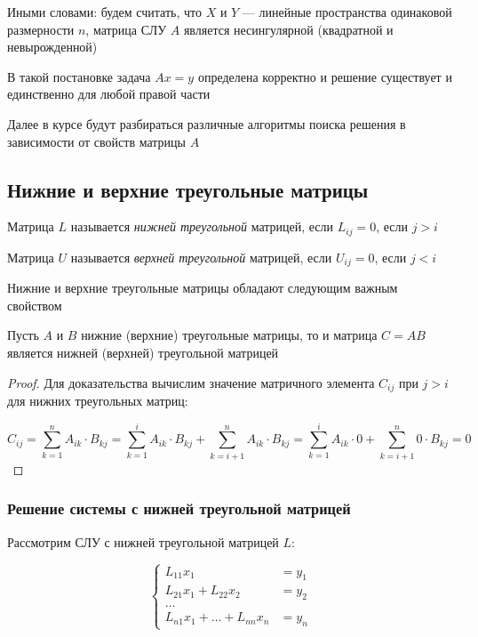 Иными словами: будем считать, что $X$ и $Y$ --- линейные пространства одинаковой размерности $n$, матрица СЛУ $A$ является несингулярной (квадратной и невырожденной)

В такой постановке задача $Ax=y$ определена корректно и решение существует и единственно для любой правой части

Далее в курсе будут разбираться различные алгоритмы поиска решения в зависимости от свойств матрицы $A$

\subsection{Нижние и верхние треугольные матрицы}

\begin{definition}
Матрица $L$ называется \textit{нижней треугольной} матрицей, если $L_{ij} = 0$, если $j > i$
\end{definition}

\begin{definition}
Матрица $U$ называется \textit{верхней треугольной} матрицей, если $U_{ij} = 0$, если $j < i$
\end{definition}

Нижние и верхние треугольные матрицы обладают следующим важным свойством

\begin{claim}
Пусть $A$ и $B$ нижние (верхние) треугольные матрицы, то и матрица $C = AB$ является нижней (верхней) треугольной матрицей
\end{claim}

\begin{proof}
    Для доказательства вычислим значение матричного элемента $C_{ij}$ при $j > i$ для нижних треугольных матриц:

    \[
    C_{ij} = \sum\limits_{k = 1}^n A_{ik} \cdot B_{kj} = \sum\limits_{k = 1}^i A_{ik} \cdot B_{kj} + \sum\limits_{k = i+1}^n A_{ik} \cdot B_{kj} = \sum\limits_{k = 1}^i A_{ik} \cdot 0 + \sum\limits_{k = i+1}^n 0 \cdot B_{kj} = 0
    \]
\end{proof}

\subsubsection*{Решение системы с нижней треугольной матрицей}

Рассмотрим СЛУ с нижней треугольной матрицей $L$:

\begin{equation*}\label{lowerTrigSLE}
    \begin{cases}
        L_{11}x_1 &= y_1\\
        L_{21}x_1 + L_{22}x_2 &=y_2\\
        \ldots\\
        L_{n1}x_1 + \ldots + L_{nn}x_n &= y_n
    \end{cases}
\end{equation*}

